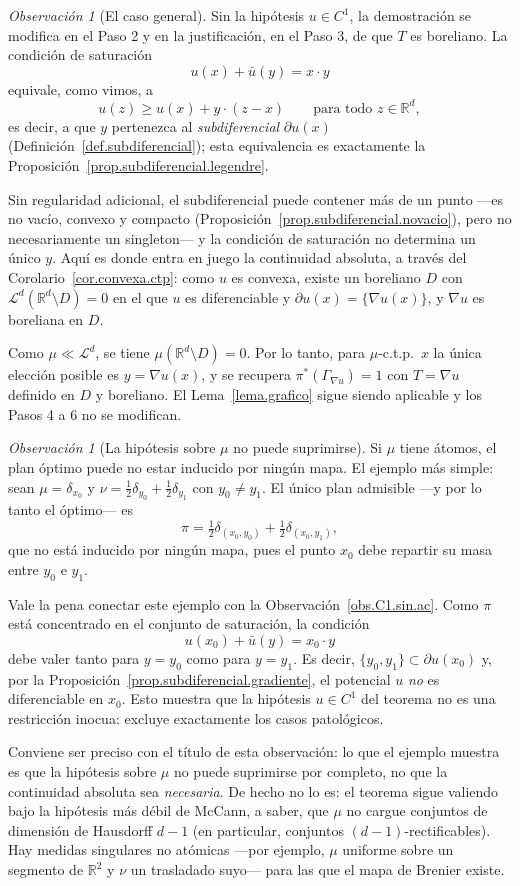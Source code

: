 \documentclass[12pt, a4paper]{amsbook}
\newcommand{\R}{{\mathbb R}}
\theoremstyle{remark}
\newtheorem{obs}[teo]{Observación}
\theoremstyle{definition}
\numberwithin{section}{chapter}
\numberwithin{subsection}{section}
\numberwithin{equation}{section}
\numberwithin{figure}{chapter}
\begin{document}
\begin{obs}[El caso general]\label{obs.Brenier.general}
Sin la hipótesis $u\in C^1$, la demostración se modifica en el Paso 2 y en la
justificación, en el Paso 3, de que $T$ es boreliano. La condición de saturación
\[
u(x)+\bar u(y)=x\cdot y
\]
equivale, como vimos, a
\[
u(z)\geq u(x)+y\cdot(z-x)
\qquad\text{para todo }z\in\R^d,
\]
es decir, a que $y$ pertenezca al \emph{subdiferencial} $\partial u(x)$
(Definición~\ref{def.subdiferencial}); esta equivalencia es exactamente la
Proposición~\ref{prop.subdiferencial.legendre}.

Sin regularidad adicional, el subdiferencial puede contener más de un punto
—es no vacío, convexo y compacto (Proposición~\ref{prop.subdiferencial.novacio}),
pero no necesariamente un singleton— y la condición de saturación no determina
un único $y$. Aquí es donde entra en juego la continuidad absoluta, a través
del Corolario~\ref{cor.convexa.ctp}: como $u$ es convexa, existe un boreliano
$D$ con $\mathcal L^d(\R^d\setminus D)=0$ en el que $u$ es diferenciable y
$\partial u(x)=\{\nabla u(x)\}$, y $\nabla u$ es boreliana en $D$.

Como $\mu\ll\mathcal L^d$, se tiene $\mu(\R^d\setminus D)=0$. Por lo tanto,
para $\mu$-c.t.p.\ $x$ la única elección posible es $y=\nabla u(x)$, y se
recupera $\pi^*(\Gamma_{\nabla u})=1$ con $T=\nabla u$ definido en $D$ y
boreliano. El Lema~\ref{lema.grafico} sigue siendo aplicable y los Pasos 4 a
6 no se modifican.
\end{obs}

\begin{obs}[La hipótesis sobre $\mu$ no puede suprimirse]\label{obs.ac.necesaria}
Si $\mu$ tiene átomos, el plan óptimo puede no estar inducido por ningún mapa.
El ejemplo más simple: sean $\mu=\delta_{x_0}$ y
$\nu=\tfrac12\delta_{y_0}+\tfrac12\delta_{y_1}$ con $y_0\neq y_1$. El único
plan admisible —y por lo tanto el óptimo— es
\[
\pi=\tfrac12\delta_{(x_0,y_0)}+\tfrac12\delta_{(x_0,y_1)},
\]
que no está inducido por ningún mapa, pues el punto $x_0$ debe repartir su
masa entre $y_0$ e $y_1$.

Vale la pena conectar este ejemplo con la Observación~\ref{obs.C1.sin.ac}. Como
$\pi$ está concentrado en el conjunto de saturación, la condición
\[
u(x_0)+\bar u(y)=x_0\cdot y
\]
debe valer tanto para $y=y_0$ como para $y=y_1$. Es decir,
$\{y_0,y_1\}\subset\partial u(x_0)$ y, por la
Proposición~\ref{prop.subdiferencial.gradiente}, el potencial $u$ \emph{no}
es diferenciable en $x_0$. Esto muestra que la hipótesis $u\in C^1$ del teorema
no es una restricción inocua: excluye exactamente los casos patológicos.

Conviene ser preciso con el título de esta observación: lo que el ejemplo
muestra es que la hipótesis sobre $\mu$ no puede suprimirse por completo, no
que la continuidad absoluta sea \emph{necesaria}. De hecho no lo es: el
teorema sigue valiendo bajo la hipótesis más débil de McCann, a saber, que
$\mu$ no cargue conjuntos de dimensión de Hausdorff $d-1$ (en particular,
conjuntos $(d-1)$-rectificables). Hay medidas singulares no atómicas
—por ejemplo, $\mu$ uniforme sobre un segmento de $\R^2$ y $\nu$ un
trasladado suyo— para las que el mapa de Brenier existe.
\end{obs}
\end{document}
